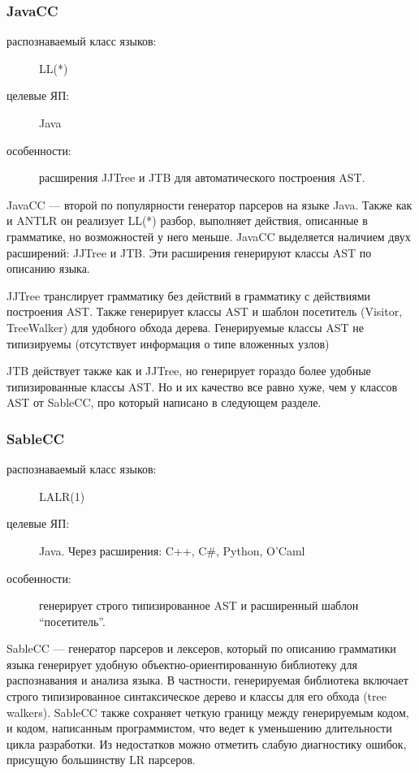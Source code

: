 \documentclass[a4paper,12pt,titlepage]{extarticle}
\begin{document}
\subsubsection*{JavaCC}
\begin{description}
  \item[распознаваемый класс языков:] LL(*)
  \item[целевые ЯП:] Java
  \item[особенности:] расширения JJTree и JTB для автоматического построения
  AST.
\end{description}
JavaCC --- второй по популярности генератор парсеров на языке Java. Также как и
ANTLR он реализует LL(*) разбор, выполняет действия, описанные в грамматике, но
возможностей у него меньше. JavaCC выделяется наличием двух расширений: JJTree и
JTB. Эти расширения генерируют классы AST по описанию языка.

JJTree транслирует грамматику без действий в грамматику с действиями
построения AST. Также генерирует классы AST и шаблон посетитель
(Visitor, TreeWalker) для удобного обхода дерева. Генерируемые классы AST не
типизируемы (отсутствует информация о типе вложенных узлов)

JTB действует также как и JJTree, но генерирует гораздо более удобные
типизированные классы AST. Но и их качество все равно хуже, чем у классов AST от
SableCC, про который написано в следующем разделе.

\subsubsection*{SableCC}
\label{sablecc}
\begin{description}
  \item[распознаваемый класс языков:] LALR(1)
  \item[целевые ЯП:] Java. Через расширения: C++, C\#, Python, O'Caml
  \item[особенности:] генерирует строго типизированное AST и расширенный
 	шаблон ``посетитель''.
\end{description}

SableCC --- генератор парсеров и лексеров, который по описанию грамматики языка
генерирует удобную объектно-ориентированную библиотеку для распознавания
и анализа языка. В частности, генерируемая
библиотека включает строго типизированное синтаксическое дерево и классы для
его обхода (tree walkers). SableCC  также сохраняет четкую границу между
генерируемым кодом, и кодом, написанным программистом, что ведет к уменьшению
длительности цикла разработки. Из недостатков можно отметить слабую диагностику
ошибок, присущую большинству LR парсеров.
\end{document}
